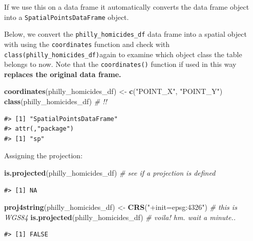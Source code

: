 \documentclass[]{book}
\newenvironment{Shaded}{\begin{snugshade}}{\end{snugshade}}
\newcommand{\KeywordTok}[1]{\textcolor[rgb]{0.13,0.29,0.53}{\textbf{#1}}}
\newcommand{\StringTok}[1]{\textcolor[rgb]{0.31,0.60,0.02}{#1}}
\newcommand{\CommentTok}[1]{\textcolor[rgb]{0.56,0.35,0.01}{\textit{#1}}}
\newcommand{\NormalTok}[1]{#1}
\begin{document}
If we use this on a data frame it automatically converts the data frame
object into a \texttt{SpatialPointsDataFrame} object.

Below, we convert the \texttt{philly\_homicides\_df} data frame into a
spatial object with using the \texttt{coordinates} function and check
with \texttt{class(philly\_homicides\_df)}again to examine which object
class the table belongs to now. Note that the \texttt{coordinates()}
function if used in this way \textbf{replaces the original data frame.}

\begin{Shaded}
\begin{Highlighting}[]
\KeywordTok{coordinates}\NormalTok{(philly_homicides_df) <-}\StringTok{ }\KeywordTok{c}\NormalTok{(}\StringTok{"POINT_X"}\NormalTok{, }\StringTok{"POINT_Y"}\NormalTok{)}
\KeywordTok{class}\NormalTok{(philly_homicides_df) }\CommentTok{# !! }
\end{Highlighting}
\end{Shaded}

\begin{verbatim}
#> [1] "SpatialPointsDataFrame"
#> attr(,"package")
#> [1] "sp"
\end{verbatim}

Assigning the projection:

\begin{Shaded}
\begin{Highlighting}[]
\KeywordTok{is.projected}\NormalTok{(philly_homicides_df) }\CommentTok{# see if a projection is defined  }
\end{Highlighting}
\end{Shaded}

\begin{verbatim}
#> [1] NA
\end{verbatim}

\begin{Shaded}
\begin{Highlighting}[]
\KeywordTok{proj4string}\NormalTok{(philly_homicides_df) <-}\StringTok{ }\KeywordTok{CRS}\NormalTok{(}\StringTok{"+init=epsg:4326"}\NormalTok{) }\CommentTok{# this is WGS84}
\KeywordTok{is.projected}\NormalTok{(philly_homicides_df) }\CommentTok{# voila! hm. wait a minute..}
\end{Highlighting}
\end{Shaded}

\begin{verbatim}
#> [1] FALSE
\end{verbatim}
\end{document}
